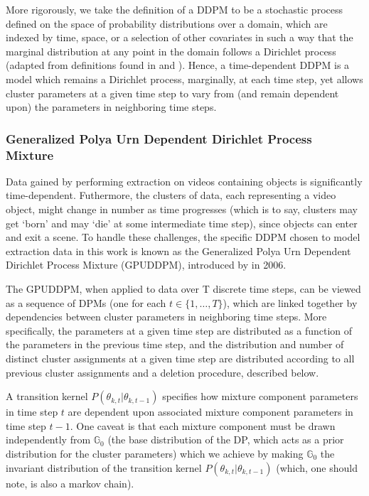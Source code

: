 \documentclass[smallcondensed, final]{svjour3}
\begin{document}
More rigorously, we take the definition of a DDPM to be a stochastic process defined on the space of probability distributions over a domain, which are indexed by time, space, or a selection of other covariates in such a way that the marginal distribution at any point in the domain follows a Dirichlet process (adapted from definitions found in \cite{gasthaus_thesis} and \cite{griffin2006order}). Hence, a time-dependent DDPM is a model which remains a Dirichlet process, marginally, at each time step, yet allows cluster parameters at a given time step to vary from (and remain dependent upon) the parameters in neighboring time steps.






\subsubsection{Generalized Polya Urn Dependent Dirichlet Process Mixture}
\label{sec:gpuddpm}

Data gained by performing extraction on videos containing objects is significantly time-dependent. Futhermore, the clusters of data, each representing a video object, might change in number as time progresses (which is to say, clusters may get `born' and may `die' at some intermediate time step), since objects can enter and exit a scene. To handle these challenges, the specific DDPM chosen to model extraction data in this work is known as the Generalized Polya Urn Dependent Dirichlet Process Mixture (GPUDDPM), introduced by \cite{caron_2007} in 2006.

The GPUDDPM, when applied to data over T discrete time steps, can be viewed as a sequence of DPMs (one for each $t \in \{1, \ldots, T \}$), which are linked together by dependencies between cluster parameters in neighboring time steps. More specifically, the parameters at a given time step are distributed as a function of the parameters in the previous time step, and the distribution and number of distinct cluster assignments at a given time step are distributed according to all previous cluster assignments and a deletion procedure, described below.

A transition kernel $P(\theta_{k,t} | \theta_{k,t-1})$ specifies how mixture component parameters in time step $t$ are dependent upon associated mixture component parameters in time step $t-1$. One caveat is that each mixture component must be drawn independently from $\mathbb{G}_{0}$ (the base distribution of the DP, which acts as a prior distribution for the cluster parameters) which we achieve by making $\mathbb{G}_{0}$ the invariant distribution of the transition kernel $P(\theta_{k,t} | \theta_{k,t-1})$ (which, one should note, is also a markov chain).
\end{document}
